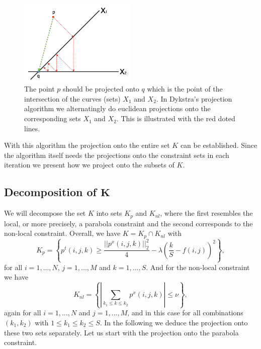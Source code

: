 \documentclass[abstracton]{scrreprt}
\begin{document}
            \begin{figure}[!ht]
                \centering
                \includegraphics[width=0.5\textwidth]{img/dykstra.png}
                \caption[Dykstra's iteration scheme.]{The point $p$ should be projected onto $q$ which is the point of the intersection of the curves (sets) $X_{1}$ and $X_{2}$. In Dykstra's projection algorithm we alternatingly do euclidean projections onto the corresponding sets $X_{1}$ and $X_{2}$. This is illustrated with the red doted lines.}
                \label{fig:dykstra}
            \end{figure}
            With this algorithm the projection onto the entire set $K$ can be established. Since the algorithm itself needs the projections onto the constraint sets in each iteration we present how we project onto the subsets of $K$.
        \subsection{Decomposition of $\boldsymbol{K}$} %
        \label{sub:decomposition_of_K}
            We will decompose the set $K$ into sets $K_{p}$ and $K_{nl}$, where the first resembles the local, or more precisely, a parabola constraint and the second corresponds to the non-local constraint. Overall, we have $K = K_{p} \cap K_{nl}$ with
                $$
                    K_{p} = \left\{ p^{t}(i, j, k) \ge \frac{||p^{x}(i, j, k)||_{2}^{2}}{4} - \lambda(\frac{k}{S} - f(i,j))^{2} \right\},
                $$
            for all $i = 1, ..., N$, $j = 1, ..., M$ and $k = 1, ..., S$. And for the non-local constraint we have
                $$
                    K_{nl} = \left\{ \left| \sum_{k_{1} \le k \le k_{2}} p^{x}(i, j, k) \right| \le \nu \right\},
                $$
            again for all $i = 1, ..., N$ and $j = 1, ..., M$, and in this case for all combinations $(k_{1}, k_{2})$ with $1 \le k_{1} \le k_{2} \le S$. In the following we deduce the projection onto these two sets separately. Let us start with the projection onto the parabola constraint.
\end{document}
